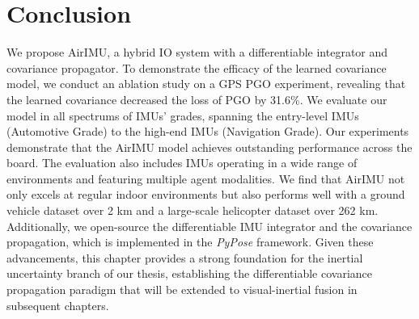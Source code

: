 \section{Conclusion}

We propose AirIMU, a hybrid IO system with a differentiable integrator and covariance propagator. 
To demonstrate the efficacy of the learned covariance model, we conduct an ablation study on a GPS PGO experiment, revealing that the learned covariance decreased the loss of PGO by 31.6\%. 
We evaluate our model in all spectrums of IMUs' grades, spanning the entry-level IMUs (Automotive Grade) to the high-end IMUs (Navigation Grade). 
Our experiments demonstrate that the AirIMU model achieves outstanding performance across the board. The evaluation also includes IMUs operating in a wide range of environments and featuring multiple agent modalities. 
We find that AirIMU not only excels at regular indoor environments but also performs well with a ground vehicle dataset over 2 \si{\km} and a large-scale helicopter dataset over 262 \si{\km}.
Additionally, we open-source the differentiable IMU integrator and the covariance propagation, which is implemented in the \textit{PyPose} framework.
Given these advancements, this chapter provides a strong foundation for the inertial uncertainty branch of our thesis, establishing the differentiable covariance propagation paradigm that will be extended to visual-inertial fusion in subsequent chapters.
